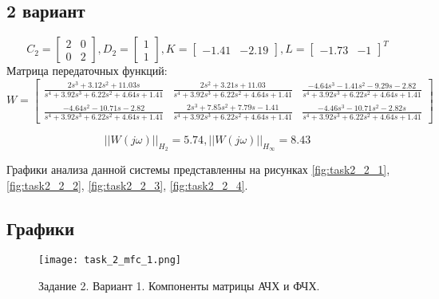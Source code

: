 \subsection{2 вариант}
\begin{equation*}
    C_2 = \begin{bmatrix}
        2 & 0 \\
        0 & 2
    \end{bmatrix}, 
    D_2 = \begin{bmatrix}
        1 \\ 1
    \end{bmatrix},
    K = \begin{bmatrix}
        -1.41 & -2.19
    \end{bmatrix},
    L = \begin{bmatrix}
        -1.73 & -1
    \end{bmatrix}^T
\end{equation*}
Матрица передаточных функций:
\begin{equation*}
    W = 
    \begin{bmatrix}
        \frac{2s^3+3.12s^2+11.03s}{s^4 + 3.92s^3 + 6.22s^2 + 4.64s + 1.41} & \frac{2s^2+3.21s+11.03}{s^4 + 3.92s^3 + 6.22s^2 + 4.64s + 1.41} & \frac{-4.64s^3-1.41s^2-9.29s -2.82}{s^4 + 3.92s^3 + 6.22s^2 + 4.64s + 1.41} \\
        \frac{-4.64s^2-10.71s-2.82}{s^4 + 3.92s^3 + 6.22s^2 + 4.64s + 1.41} & \frac{2s^3 + 7.85s^2+7.79s-1.41}{s^4 + 3.92s^3 + 6.22s^2 + 4.64s + 1.41} & \frac{-4.46s^3-10.71s^2-2.82s}{s^4 + 3.92s^3 + 6.22s^2 + 4.64s + 1.41}
    \end{bmatrix}
\end{equation*}

\begin{equation*}
    ||W(j\omega)||_{H_2} = 5.74, ||W(j\omega)||_{H_\infty} = 8.43
\end{equation*}

Графики анализа данной системы представленны на рисунках \ref{fig:task2_2_1}, \ref{fig:task2_2_2}, \ref{fig:task2_2_3}, \ref{fig:task2_2_4}.

\subsection{Графики}
\begin{figure}[]
    \centering
    \texttt{[image: task\_2\_mfc\_1.png]}
    \caption{\label{fig:task2_1_1}Задание 2. Вариант 1. Компоненты матрицы АЧХ и ФЧХ.}
\end{figure}

